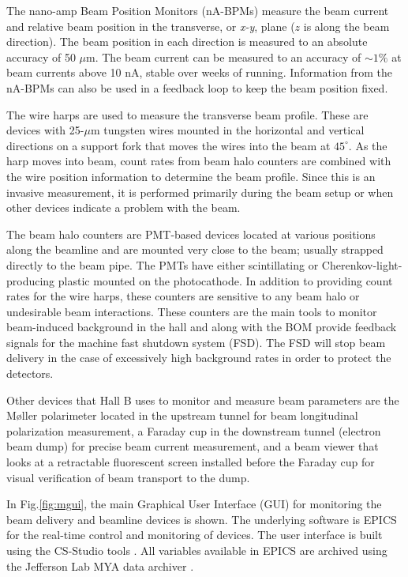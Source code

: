 The nano-amp Beam Position Monitors (nA-BPMs) \cite{naBPM} measure the beam current and relative beam position in the transverse, 
or {\it x-y}, plane ($z$ is along the beam direction).  The beam position in each direction is measured to an absolute accuracy 
of 50 $\mu$m. The beam current can be measured to an accuracy of $\sim 1\%$ at beam currents above 10 nA, stable over weeks of
running.  Information from the nA-BPMs can also be used in a feedback  loop to keep the beam position fixed.

The wire harps \cite{wireharp} are used to measure the transverse beam profile. These are devices with 25-$\mu$m tungsten wires 
mounted in the horizontal and vertical directions on a support fork that moves the wires into the beam at $45^\circ$. As 
the harp moves into beam, count rates from beam halo counters are combined with the wire position information to determine the beam profile.
Since this is an invasive measurement, it is performed primarily during the beam setup or when other devices indicate a problem with the beam. 

The beam halo counters are PMT-based devices located at various positions along the beamline and are mounted very close to the 
beam; usually strapped directly to the beam pipe. The PMTs have either scintillating or Cherenkov-light-producing plastic mounted on 
the photocathode. In addition to providing count rates for the wire harps, these counters are sensitive to any beam halo or undesirable 
beam interactions. These counters are the main tools to monitor beam-induced background in the hall and along with the BOM provide 
feedback signals for the machine fast shutdown system (FSD). The FSD will stop beam delivery in the case of excessively high background
rates in order to protect the detectors. 

Other devices that Hall B uses to monitor and measure beam parameters are the M{\o}ller polarimeter located in the upstream tunnel for beam 
longitudinal polarization measurement, a Faraday cup in the downstream tunnel (electron beam dump) for precise beam current measurement, 
and a beam viewer that looks at a retractable fluorescent screen installed before the Faraday cup for visual verification of beam transport to 
the dump.     

In Fig.\ref{fig:mgui}, the main Graphical User Interface (GUI) for monitoring the beam delivery and beamline devices is shown. The 
underlying software is EPICS \cite{EPICS} for the real-time control and monitoring of devices. The user interface is built using the 
CS-Studio tools \cite{CS-Studio}. All variables available in EPICS are archived using the Jefferson Lab MYA data archiver \cite{MYA}. 

